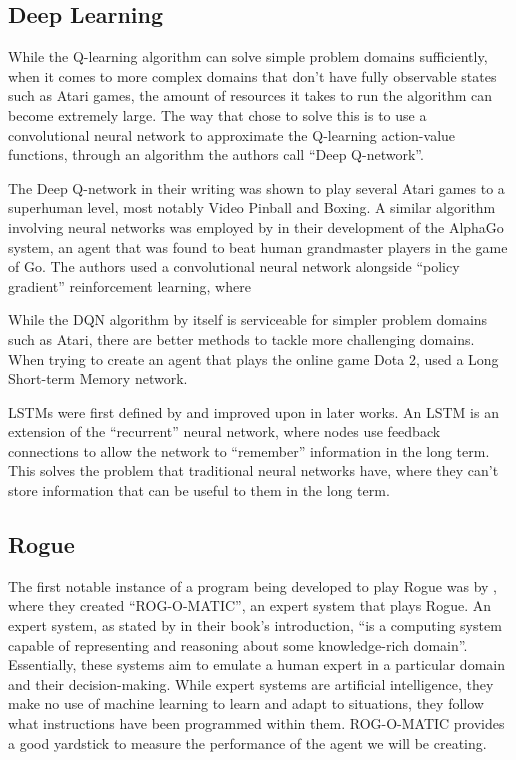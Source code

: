 \documentclass[11pt,a4paper]{article}
\begin{document}
\subsection{Deep Learning}
While the Q-learning algorithm can solve simple problem domains sufficiently, when it comes to more complex domains that don't have fully observable states such as Atari games, the amount of resources it takes to run the algorithm can become extremely large. The way that \cite{mnih15} chose to solve this is to use a convolutional neural network to approximate the Q-learning action-value functions, through an algorithm the authors call ``Deep Q-network''.

The Deep Q-network in their writing was shown to play several Atari games to a superhuman level, most notably Video Pinball and Boxing. A similar algorithm involving neural networks was employed by \cite{silver16} in their development of the AlphaGo system, an agent that was found to beat human grandmaster players in the game of Go. The authors used a convolutional neural network alongside ``policy gradient'' reinforcement learning, where

While the DQN algorithm by itself is serviceable for simpler problem domains such as Atari, there are better methods to tackle more challenging domains. When trying to create an agent that plays the online game Dota 2, \cite{berner19} used a Long Short-term Memory network.

LSTMs were first defined by \cite{hochreiter97} and improved upon in later works. An LSTM is an extension of the ``recurrent'' neural network, where nodes use feedback connections to allow the network to ``remember'' information in the long term. This solves the problem that traditional neural networks have, where they can't store information that can be useful to them in the long term.

\subsection{Rogue}
The first notable instance of a program being developed to play Rogue was by \cite{mauldin83}, where they created ``ROG-O-MATIC'', an expert system that plays Rogue. An expert system, as stated by \cite{jackson86} in their book's introduction, ``is a computing system capable of representing and reasoning about some knowledge-rich domain''. Essentially, these systems aim to emulate a human expert in a particular domain and their decision-making. While expert systems are artificial intelligence, they make no use of machine learning to learn and adapt to situations, they follow what instructions have been programmed within them. ROG-O-MATIC provides a good yardstick to measure the performance of the agent we will be creating.
\end{document}
